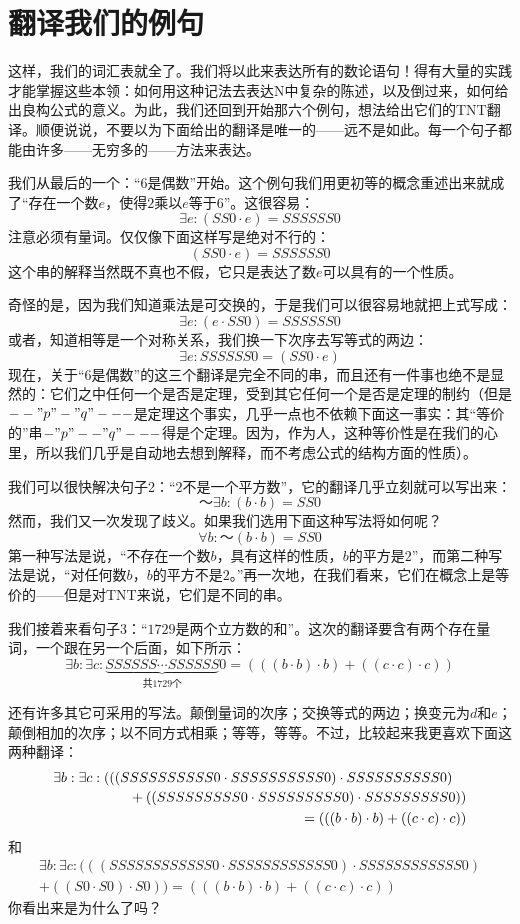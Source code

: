\section{翻译我们的例句}

这样，我们的词汇表就全了。我们将以此来表达所有的数论语句！得有大量的实践才能掌握这些本领：如何用这种记法去表达N中复杂的陈述，以及倒过来，如何给出良构公式的意义。为此，我们还回到开始那六个例句，想法给出它们的TNT翻译。顺便说说，不要以为下面给出的翻译是唯一的——远不是如此。每一个句子都能由许多——无穷多的——方法来表达。

我们从最后的一个：“$6$是偶数”开始。这个例句我们用更初等的概念重述出来就成了“存在一个数$e$，使得$2$乘以$e$等于$6$”。这很容易：
\[
\exists e:(SS0\cdot e)=SSSSSS0
\]
注意必须有量词。仅仅像下面这样写是绝对不行的：
\[
(SS0\cdot e)=SSSSSS0
\]
这个串的解释当然既不真也不假，它只是表达了数$e$可以具有的一个性质。

奇怪的是，因为我们知道乘法是可交换的，于是我们可以很容易地就把上式写成：
\[
\exists e:(e\cdot SS0)=SSSSSS0
\]
或者，知道相等是一个对称关系，我们换一下次序去写等式的两边：
\[
\exists e:SSSSSS0=(SS0\cdot e)
\]
\MakeMinusOrd
现在，关于“$6$是偶数”的这三个翻译是完全不同的串，而且还有一件事也绝不是显然的：它们之中任何一个是否是定理，受到其它任何一个是否是定理的制约（但是$--"p"-"q"---$是定理这个事实，几乎一点也不依赖下面这一事实：其“等价的”串$-"p"--"q"---$得是个定理。因为，作为人，这种等价性是在我们的心里，所以我们几乎是自动地去想到解释，而不考虑公式的结构方面的性质）。
\MakeMinusBin

我们可以很快解决句子2：“$2$不是一个平方数”，它的翻译几乎立刻就可以写出来：
\[
～\exists b:(b\cdot b)=SS0
\]
然而，我们又一次发现了歧义。如果我们选用下面这种写法将如何呢？
\[
\forall b:～(b\cdot b)=SS0
\]
第一种写法是说，“不存在一个数$b$，具有这样的性质，$b$的平方是$2$”，而第二种写法是说，“对任何数$b$，$b$的平方不是$2$。”再一次地，在我们看来，它们在概念上是等价的——但是对TNT来说，它们是不同的串。

我们接着来看句子3：“$1729$是两个立方数的和”。这次的翻译要含有两个存在量词，一个跟在另一个后面，如下所示：
\[
\exists b: \exists c:
\underbrace{SSSSSS\cdots SSSSSS}_{\text{共$1729$个}}0
=(((b\cdot b)\cdot b)+((c\cdot c)\cdot c))
\]

还有许多其它可采用的写法。颠倒量词的次序；交换等式的两边；换变元为$d$和$e$；颠倒相加的次序；以不同方式相乘；等等，等等。不过，比较起来我更喜欢下面这两种翻译：
\[
\begin{multlined}
\exists b:\exists c:(((SSSSSSSSSS0\cdot SSSSSSSSSS0)\cdot SSSSSSSSSS0)\\
  \shoveright{{} + ((SSSSSSSSS0\cdot SSSSSSSSS0)\cdot SSSSSSSSS0))} \\
  {} = (((b\cdot b)\cdot b)+((c\cdot c)\cdot c))
\end{multlined}
\]
和
\[
\begin{multlined}
\exists b:\exists c:(((SSSSSSSSSSSS0\cdot SSSSSSSSSSSS0)
  \cdot SSSSSSSSSSSS0) \\
+((S0\cdot S0)\cdot S0))=(((b\cdot b)\cdot b)+((c\cdot c)\cdot c))
\end{multlined}
\]
你看出来是为什么了吗？

